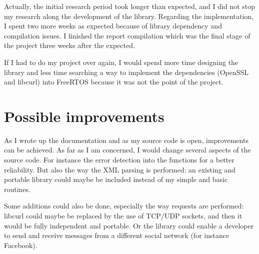 Actually, the initial research period took longer than expected, and I did not stop my research along the development of the library. 
Regarding the implementation, I spent two more weeks as expected because of library dependency and compilation issues. I finished the report compilation which was the final stage of the project three weeks after the expected.

If I had to do my project over again, I would spend more time designing the library and less time searching a way to implement the dependencies (OpenSSL and libcurl) into FreeRTOS because it was not the point of the project.


\section{Possible improvements}

\hspace{15mm}As I wrote up the documentation and as my source code is open, improvements can be achieved. As far as I am concerned, I would change several aspects of the source code. For instance the error detection into the functions for a better reliability. But also the way the XML parsing is performed: an existing and portable library could maybe be included instead of my simple and basic routines.

Some additions could also be done, especially the way requests are performed: libcurl could maybe be replaced by the use of TCP/UDP sockets, and then it would be fully independent and portable. Or the library could enable a developer to send and receive messages from a different social network (for instance Facebook).


\clearpage